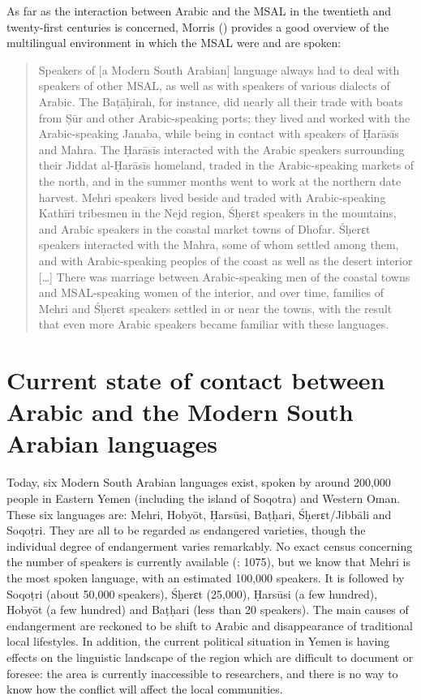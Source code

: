 \documentclass[output=paper]{langsci/langscibook}
\begin{document}
As far as the interaction between Arabic and the MSAL in the twentieth and twenty-first centuries is concerned, Morris (\citeyear[25]{Morris2017}) provides a good overview of the multilingual environment in which the MSAL were and are spoken: 

\begin{quote}
Speakers of [a Modern South Arabian] language always had to deal with speakers of other MSAL, as well as with speakers of various dialects of Arabic. The Baṭāḥirah, for instance, did nearly all their trade with boats from Ṣūr and other Arabic-speaking ports; they lived and worked with the Arabic-speaking Janaba, while being in contact with speakers of Ḥarāsīs and Mahra. The Ḥarāsīs interacted with the Arabic speakers surrounding their Jiddat al-Ḥarāsīs homeland, traded in the Arabic-speaking markets of the north, and in the summer months went to work at the northern date harvest. Mehri speakers lived beside and traded with Arabic-speaking Kathīri tribesmen in the Nejd region, Śḥerɛt speakers in the mountains, and Arabic speakers in the coastal market towns of Dhofar. Śḥerɛt speakers interacted with the Mahra, some of whom settled among them, and with Arabic-speaking peoples of the coast as well as the desert interior […] There was marriage between Arabic-speaking men of the coastal towns and MSAL-speaking women of the interior, and over time, families of Mehri and Śḥerɛt speakers settled in or near the towns, with the result that even more Arabic speakers became familiar with these languages. \citep[25]{Morris2017}
\end{quote}

\section{Current state of contact between Arabic and the Modern South Arabian languages}\label{sec:2}

Today, six Modern South Arabian languages exist, spoken by around 200,000 people in Eastern Yemen (including the island of Soqotra) and Western Oman. These six languages are: Mehri, Hobyōt, Ḥarsūsi, Baṭḥari, Śḥerɛt/Jibbāli and Soqoṭri. They are all to be regarded as endangered varieties, though the individual degree of endangerment varies remarkably. No exact census concerning the number of speakers is currently available (\citealt{Simeone-Senelle2011}: 1075), but we know that Mehri is the most spoken language, with an estimated 100,000 speakers. It is followed by Soqoṭri (about 50,000 speakers), Śḥerɛt (25,000), Ḥarsūsi (a few hundred), Hobyōt (a few hundred) and Baṭḥari (less than 20 speakers). The main causes of endangerment are reckoned to be shift to Arabic and disappearance of traditional local lifestyles. In addition, the current political situation in Yemen is having effects on the linguistic landscape of the region which are difficult to document or foresee: the area is currently inaccessible to researchers, and there is no way to know how the conflict will affect the local communities.
\end{document}
